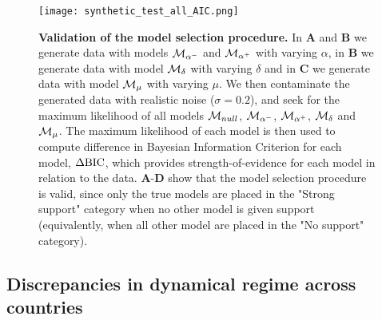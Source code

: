 \begin{figure}
  \centering
  \texttt{[image: synthetic\_test\_all\_AIC.png]}
  \caption{\small
  \textbf{Validation of the model selection procedure.} In \textbf{A} and $\textbf{B}$ we generate data with models $\mathcal{M}_{\alpha^-}$ and $\mathcal{M}_{\alpha^+}$ with varying $\alpha$, in \textbf{B} we generate data with model $\mathcal{M}_\delta$ with varying $\delta$ and in \textbf{C} we generate data with model $\mathcal{M}_\mu$ with varying $\mu$. We then contaminate the generated data with realistic noise ($\sigma = 0.2$), and seek for the maximum likelihood of all models $\mathcal{M}_{null}$, $\mathcal{M}_{\alpha^-}$, $\mathcal{M}_{\alpha^+}$, $\mathcal{M}_\delta$ and $\mathcal{M}_\mu$. The maximum likelihood of each model is then used to compute difference in Bayesian Information Criterion for each model, $\Delta \text{BIC}$, which provides strength-of-evidence for each model in relation to the data. 
  \textbf{A}-\textbf{D} show that the model selection procedure is valid, since only the true models are placed in the "Strong support" category when no other model is given support (equivalently, when all other model are placed in the "No support" category).}
  \label{fig:synthetic_test_all_AIC}
\end{figure}
\FloatBarrier

\subsection{Discrepancies in dynamical regime across countries}

